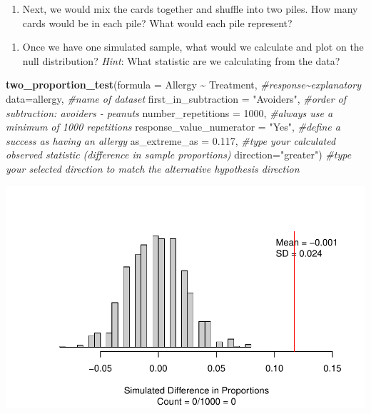 \documentclass[
]{report}
\newenvironment{Shaded}{\begin{snugshade}}{\end{snugshade}}
\newcommand{\AttributeTok}[1]{\textcolor[rgb]{0.13,0.29,0.53}{#1}}
\newcommand{\CommentTok}[1]{\textcolor[rgb]{0.56,0.35,0.01}{\textit{#1}}}
\newcommand{\DecValTok}[1]{\textcolor[rgb]{0.00,0.00,0.81}{#1}}
\newcommand{\FloatTok}[1]{\textcolor[rgb]{0.00,0.00,0.81}{#1}}
\newcommand{\FunctionTok}[1]{\textcolor[rgb]{0.13,0.29,0.53}{\textbf{#1}}}
\newcommand{\NormalTok}[1]{#1}
\newcommand{\SpecialCharTok}[1]{\textcolor[rgb]{0.81,0.36,0.00}{\textbf{#1}}}
\newcommand{\StringTok}[1]{\textcolor[rgb]{0.31,0.60,0.02}{#1}}
\providecommand{\tightlist}{%
  \setlength{\itemsep}{0pt}\setlength{\parskip}{0pt}}
\begin{document}
\vspace{0.5in}

\begin{enumerate}
\def\labelenumi{\arabic{enumi}.}
\setcounter{enumi}{8}
\tightlist
\item
  Next, we would mix the cards together and shuffle into two piles. How many cards would be in each pile? What would each pile represent?
\end{enumerate}

\vspace{0.8in}

\begin{enumerate}
\def\labelenumi{\arabic{enumi}.}
\setcounter{enumi}{9}
\tightlist
\item
  Once we have one simulated sample, what would we calculate and plot on the null distribution? \emph{Hint}: What statistic are we calculating from the data?
\end{enumerate}

\vspace{0.8in}
\newpage

\begin{Shaded}
\begin{Highlighting}[]
\FunctionTok{two\_proportion\_test}\NormalTok{(}\AttributeTok{formula =}\NormalTok{ Allergy }\SpecialCharTok{\textasciitilde{}}\NormalTok{ Treatment, }\CommentTok{\#response\textasciitilde{}explanatory}
                    \AttributeTok{data=}\NormalTok{allergy, }\CommentTok{\#name of dataset}
                    \AttributeTok{first\_in\_subtraction =} \StringTok{"Avoiders"}\NormalTok{, }\CommentTok{\#order of subtraction: avoiders {-} peanuts}
                    \AttributeTok{number\_repetitions =} \DecValTok{1000}\NormalTok{, }\CommentTok{\#always use a minimum of 1000 repetitions}
                    \AttributeTok{response\_value\_numerator =} \StringTok{"Yes"}\NormalTok{, }\CommentTok{\#define a success as having an allergy}
                    \AttributeTok{as\_extreme\_as =} \FloatTok{0.117}\NormalTok{, }\CommentTok{\#type your calculated observed statistic (difference in sample proportions)}
                    \AttributeTok{direction=}\StringTok{"greater"}\NormalTok{) }\CommentTok{\#type your selected direction to match the alternative hypothesis direction}
\end{Highlighting}
\end{Shaded}

\begin{center}\includegraphics[width=0.7\linewidth]{10-UR-module8_9_review_files/figure-latex/unnamed-chunk-2-1} \end{center}
\end{document}
